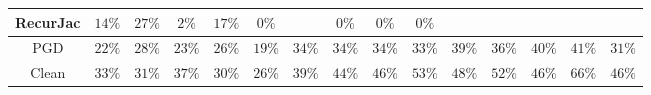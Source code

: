 \begin{table*}
{\begin{tabular}{c|c|c|c|c|c|c|c|c|c|c|c|c|c|c}
     RecurJac &        $14\%$ &        $27\%$ &         $2\%$ &        $17\%$ &         $0\%$ &               &         $0\%$ &         $0\%$ &         $0\%$ &               &               &               &               &               \\
\hline
          PGD &        $22\%$ &        $28\%$ &        $23\%$ &        $26\%$ &        $19\%$ &        $34\%$ &        $34\%$ &        $34\%$ &        $33\%$ &        $39\%$ &        $36\%$ &        $40\%$ &        $41\%$ &        $31\%$ \\
\hline
        Clean &        $33\%$ &        $31\%$ &        $37\%$ &        $30\%$ &        $26\%$ &        $39\%$ &        $44\%$ &        $46\%$ &        $53\%$ &        $48\%$ &        $52\%$ &        $46\%$ &        $66\%$ &        $46\%$ \\

    \bottomrule
    \end{tabular}
    }
    \label{table:exp-A-robust-accuracy-cifar10-8}
\end{table*}
    

